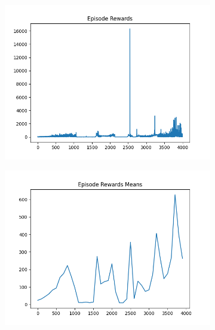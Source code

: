 \begin{figure}[H]
\begin{subfigure}{.47\linewidth}
        \includegraphics[width=\textwidth]{pole/2024-06-14_13-24-09_dqn_cartpole_episode_rewards.png}
    \end{subfigure}
    \begin{subfigure}{.47\linewidth}
        \centering
        \includegraphics[width=\textwidth]{pole/2024-06-14_13-24-09_dqn_cartpole_episode_rewards_means.png}
    \end{subfigure}
\end{figure}
